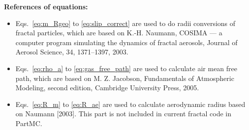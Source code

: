 \documentclass{article}
\begin{document}
\newpage
\textbf{References of equations:}
\begin{itemize}
\item Eqs.~\ref{eq:m_Rgeo} to \ref{eq:slip_correct} are used to do radii conversions of fractal particles, which are based on K.-H. Naumann, COSIMA --- a computer program simulating the dynamics of fractal aerosols, Journal of Aerosol Science, 34, 1371--1397, 2003.
\item Eqs.~\ref{eq:rho_a} to \ref{eq:gas_free_path} are used to calculate air mean free path, which are based on M. Z. Jacobson,
Fundamentals of Atmospheric Modeling, second edition, Cambridge University Press, 2005.
\item Eqs.~\ref{eq:R_m} to \ref{eq:R_ae} are used to calculate aerodynamic radius based on Naumann [2003]. This part is not included in current fractal code in PartMC.
\end{itemize}
\end{document}

